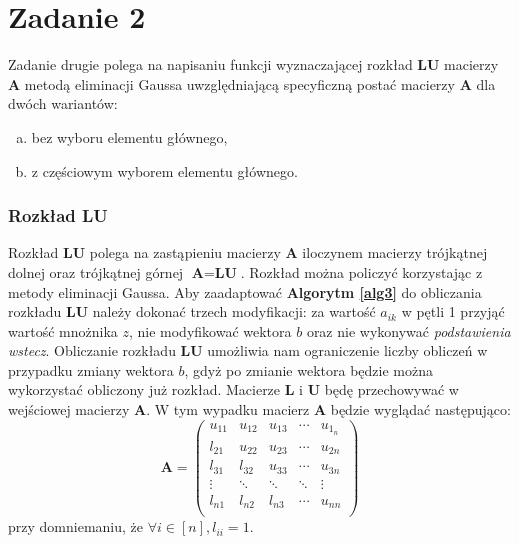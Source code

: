\documentclass[12pt]{article}
\begin{document}
\section{Zadanie 2}
Zadanie drugie polega na napisaniu funkcji wyznaczającej rozkład \textbf{LU} macierzy \textbf{A} metodą eliminacji Gaussa uwzględniającą specyficzną postać macierzy \textbf{A} dla dwóch wariantów:
\begin{enumerate}[(a)]
	\item bez wyboru elementu głównego,
	\item z częściowym wyborem elementu głównego.
\end{enumerate}


\subsubsection*{Rozkład LU}
Rozkład \textbf{LU} polega na zastąpieniu macierzy \textbf{A} iloczynem macierzy trójkątnej dolnej oraz trójkątnej górnej $\textbf{A} = \textbf{L}\textbf{U}$. Rozkład można policzyć korzystając z metody eliminacji Gaussa. Aby zaadaptować \textbf{Algorytm \ref{alg3}} do obliczania rozkładu \textbf{LU} należy dokonać trzech modyfikacji: za wartość $a_{ik}$ w pętli 1 przyjąć wartość mnożnika $z$, nie modyfikować wektora $b$ oraz nie wykonywać \textit{podstawienia wstecz}. Obliczanie rozkładu \textbf{LU} umożliwia nam ograniczenie liczby obliczeń w przypadku zmiany wektora $b$, gdyż po zmianie wektora będzie można wykorzystać obliczony już rozkład. Macierze \textbf{L} i \textbf{U} będę przechowywać w wejściowej macierzy \textbf{A}. W tym wypadku macierz \textbf{A} będzie wyglądać następująco:
\begin{equation}
\textbf{A} = 
\begin{pmatrix}
u_{1 1} & u_{1 2} & u_{1 3} & \cdots & u_{1_n}\\
l_{2 1} & u_{2 2} & u_{2 3} & \cdots & u_{2 n}\\
l_{3 1} & l_{3 2} & u_{3 3} & \cdots & u_{3 n}\\
\vdots & \ddots & \ddots & \ddots & \vdots \\
l_{n 1} & l_{n 2} & l_{n 3} & \cdots & u_{n n}\\
\end{pmatrix}
\end{equation}
przy domniemaniu, że $\forall i \in [n], l_{ii}=1$.
\end{document}
